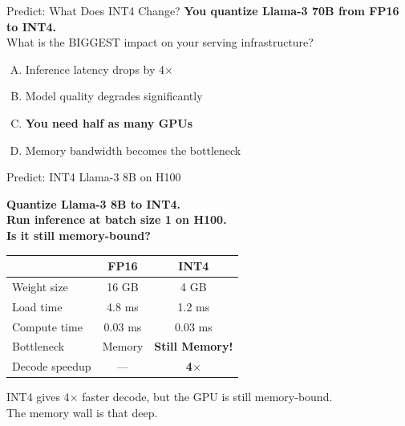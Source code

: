 \documentclass[aspectratio=169, 12pt]{beamer}
\begin{document}
\begin{frame}{Predict: What Does INT4 Change?}
\centering
\Large
\textbf{You quantize Llama-3 70B from FP16 to INT4.}\\[0.5cm]
\normalsize
What is the BIGGEST impact on your serving infrastructure?\\[0.3cm]
\begin{enumerate}[(A)]
  \item Inference latency drops by 4$\times$
  \item Model quality degrades significantly
  \item \textbf{You need half as many GPUs}
  \item Memory bandwidth becomes the bottleneck
\end{enumerate}
\end{frame}

\begin{frame}{Predict: INT4 Llama-3 8B on H100}

\centering
\Large\bfseries
Quantize Llama-3 8B to INT4.\\
Run inference at batch size 1 on H100.\\[0.5cm]
\normalsize
Is it still memory-bound?\\[0.3cm]

\pause

\small
\begin{tabular}{lcc}
\toprule
              & \textbf{FP16} & \textbf{INT4} \\
\midrule
Weight size   & 16 GB & 4 GB \\
Load time     & 4.8 ms & 1.2 ms \\
Compute time  & 0.03 ms & 0.03 ms \\
\midrule
Bottleneck    & Memory & \textbf{Still Memory!} \\
Decode speedup & --- & \textbf{4$\times$} \\
\bottomrule
\end{tabular}

\vspace{0.3cm}
\pause
\alert{INT4 gives 4$\times$ faster decode, but the GPU is still memory-bound.\\
The memory wall is that deep.}
\end{frame}
\end{document}
